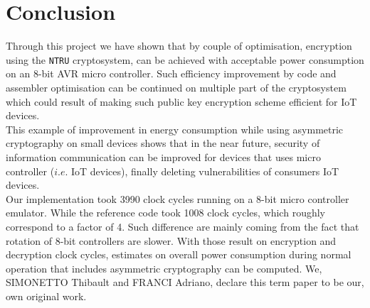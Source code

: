 \section{Conclusion}
\label{sec:conclusion}
Through this project we have shown that by couple of optimisation, encryption using the \texttt{NTRU} cryptosystem, can be achieved with acceptable power consumption on an 8-bit AVR micro controller. Such efficiency improvement by code and assembler optimisation can be continued on multiple part of the cryptosystem which could result of making such public key encryption scheme  efficient for IoT devices.\\
This example of improvement in energy consumption while using asymmetric cryptography on small devices shows that in the near future, security of information communication can be improved for devices that uses micro controller ($i.e.$ IoT devices), finally deleting vulnerabilities of consumers IoT devices.\\ 
	Our implementation took 3990 clock cycles running on a 8-bit micro controller emulator. While the reference code \cite{dai_optimizing_2018} took 1008 clock cycles, which roughly correspond to a factor of 4. Such difference are mainly coming from the fact that rotation of 8-bit controllers are slower. With those result on encryption and decryption clock cycles, estimates on overall power consumption during normal operation that includes asymmetric cryptography can be computed.
	\newline
	\newline
	\newline
	\newline
	\newline
	\newline
	\newline
	\newline
	We, SIMONETTO Thibault and FRANCI Adriano, declare this term paper to be
our, own original work.
	
